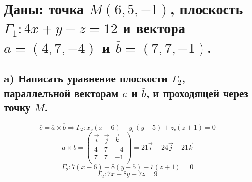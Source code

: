 \documentclass[12pt]{article}
\begin{document}
\begin{sloppypar}

    \section{Даны: точка $M(6, 5, -1)$, плоскость $\Gamma_1: 4x + y - z = 12$ и вектора $\overline{a} = (4,7,-4)$ и $\overline{b} = (7, 7, -1)$.}
    \subsection{a) Написать уравнение плоскости $\Gamma_2$, параллельной векторам $\overline{a}$ и $\overline{b}$, и проходящей через точку $M$.}
    \[
        \overline{c} = \overline{a} \times \overline{b} \Rightarrow \Gamma_2: x_c(x - 6) + y_c(y - 5) + z_c(z + 1) = 0
    \]
    \[
        \overline{a} \times \overline{b} =
        \begin{pmatrix}
            \vec i & \vec j & \vec k \\
            4      & 7      & -4     \\
            7      & 7      & -1     \\
        \end{pmatrix}
        = 21 \vec i - 24 \vec j - 21 \vec k
    \]
    \[
        \Gamma_2: 7(x - 6) - 8(y - 5) - 7(z + 1) = 0
    \]
    \[
        \Gamma_2: 7x - 8y - 7z = 9
    \]


\end{sloppypar}
\end{document}
